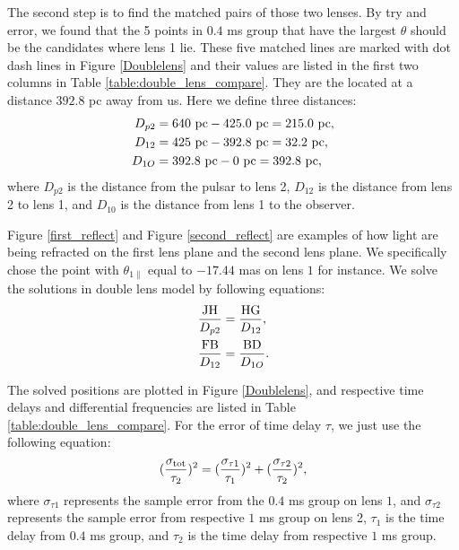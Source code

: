 \documentclass[useAMS,usenatbib]{mn2e}
\begin{document}
The second step is to find the matched pairs of those two lenses. By try and error, we found that the 5 points in $0.4$ ms group that have the largest $\theta$ should be the candidates where lens 1 lie.  These five matched lines are marked with dot dash lines in Figure \ref{Doublelens} and their values are listed in the first two columns in Table \ref{table:double_lens_compare}. They are the located at a distance $392.8$ pc away from us. Here we define three distances:
\begin{align*}
D_{p2}&=640~{\rm pc}-425.0~{\rm pc} =215.0~{\rm pc},\\
D_{12}&=425~{\rm pc}-392.8~{\rm pc} =32.2~{\rm pc},\\
D_{1O}&=392.8~{\rm pc}- 0~{\rm pc} = 392.8~{\rm pc}, 
\end{align*} 
where $D_{p2}$ is the distance from the pulsar to lens 2, $D_{12}$ is the distance from lens 2 to lens 1, and $D_{10}$ is the distance from lens 1 to the observer.

Figure \ref{first_reflect} and Figure \ref{second_reflect} are examples of how light are being refracted on the first lens plane and the second lens plane. We specifically chose the point with $\theta_{1\parallel}$ equal to $-17.44$ mas on lens $1$ for instance. We solve the solutions in double lens model by following equations:
\begin{align*}
\frac{\rm JH}{D_{p2}}&=\frac{\rm HG}{D_{12}},\\
\frac{\rm FB}{D_{12}}&=\frac{\rm BD}{D_{1O}}.
\end{align*}

The solved positions are plotted in Figure \ref{Doublelens}, and respective time delays and differential frequencies are listed in Table \ref{table:double_lens_compare}. For the error of time delay $\tau$, we just use the following equation: 
\begin{align*}
(\frac{\sigma_{\rm tot}}{\tau_2})^2 = (\frac{\sigma_{\tau1}}{\tau_1})^2+(\frac{\sigma_{\tau2}}{\tau_2})^2,
\end{align*}
where $\sigma_{\tau1}$ represents the sample error from the $0.4$ ms group on lens $1$, and $\sigma_{\tau2}$ represents the sample error from respective $1$ ms group on lens 2, $\tau_1$ is the time delay from $0.4$ ms group, and $\tau_2$ is the time delay from respective $1$ ms group.
\end{document}
